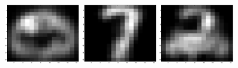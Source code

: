 \documentclass{article}
\begin{document}
\includegraphics[width=0.25\textwidth]{reconst6.eps}\hspace{0.03\textwidth}%
\includegraphics[width=0.25\textwidth]{reconst7.eps}\hspace{0.03\textwidth}%
\includegraphics[width=0.25\textwidth]{reconst8.eps}\\[4em]
\newpage
\end{document}
